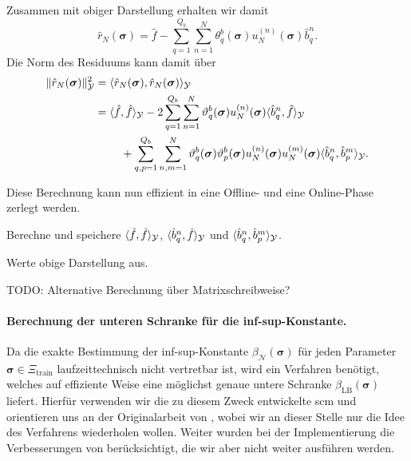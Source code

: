 \documentclass[../main.tex]{subfiles}
\begin{document}
Zusammen mit obiger Darstellung erhalten wir damit
\begin{equation}
    \hat{r}_{N}(\bm \sigma) = \hat{f} - \sum_{q = 1}^{Q_b} \sum_{n = 1}^{N} \theta_{q}^{b}(\bm \sigma) u_{N}^{(n)}(\bm \sigma) \hat{b}^{n}_{q}.
\end{equation}
Die Norm des Residuums kann damit über
\begin{equation}
    \begin{aligned}
        \norm{\hat{r}_{N}(\bm \sigma)}_{\mathcal Y}^{2}
        &= \skp{\hat{r}_{N}(\bm \sigma)}{\hat{r}_{N}(\bm \sigma)}{\mathcal Y}
        \\&= \begin{multlined}[t]
            \skp{\hat{f}}{\hat{f}}{\mathcal Y}
                - 2 \sum_{q = 1}^{Q_b} \sum_{n = 1}^{N} \theta_{q}^{b}(\bm \sigma) u_{N}^{(n)}(\bm \sigma) \skp{\hat{b}^{n}_{q}}{\hat{f}}{\mathcal Y}
                \\+ \sum_{q, p = 1}^{Q_b} \sum_{n, m = 1}^{N} \theta_{q}^{b}(\bm \sigma) \theta_{p}^{b}(\bm \sigma) u_{N}^{(n)}(\bm \sigma) u_{N}^{(m)}(\bm \sigma) \skp{\hat{b}^{n}_{q}}{\hat{b}^{m}_{p}}{\mathcal Y}.
        \end{multlined}
    \end{aligned}
\end{equation}

Diese Berechnung kann nun effizient in eine Offline- und eine Online-Phase zerlegt werden.

\begin{description}[font=\normalfont\itshape]
    \item[Offline:] Berechne und speichere $\langle\hat{f},\hat{f}\rangle_{\mathcal Y}$, $\langle\hat{b}^{n}_{q},\hat{f}\rangle_{\mathcal Y}$ und $\langle\hat{b}^{n}_{q},\hat{b}^{m}_{p}\rangle_{\mathcal Y}$.
    \item[Online:] Werte obige Darstellung aus.
\end{description}

TODO: Alternative Berechnung über Matrixschreibweise?


\paragraph{Berechnung der unteren Schranke für die inf-sup-Konstante.} %
\label{par:berechnung_der_unteren_schranke_f_r_die_inf_sup_konstante_}

Da die exakte Bestimmung der inf-sup-Konstante $\beta_{\mathcal N}(\bm \sigma)$ für jeden Parameter $\bm \sigma \in \Xi_{\mathrm{train}}$ laufzeittechnisch nicht vertretbar ist, wird ein Verfahren benötigt, welches auf effiziente Weise eine möglichst genaue untere Schranke $\beta_{\mathrm{LB}}(\bm \sigma)$ liefert.
Hierfür verwenden wir die zu diesem Zweck entwickelte \ac{scm} und orientieren uns an der Originalarbeit von \textcite{Huynh2007}, wobei wir an dieser Stelle nur die Idee des Verfahrens wiederholen wollen.
Weiter wurden bei der Implementierung die Verbesserungen von \textcite{Chen2009} berücksichtigt, die wir aber nicht weiter ausführen werden.
\end{document}
